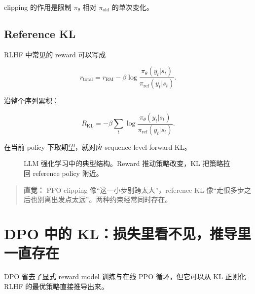 \documentclass[11pt,a4paper]{ctexart}
\newcommand{\piold}{\pi_{\mathrm{old}}}
\newcommand{\piref}{\pi_{\mathrm{ref}}}
\newcommand{\pitheta}{\pi_{\theta}}
\newenvironment{intuition}
{\begin{quote}\small\textbf{直觉：}}
{\end{quote}}
\begin{document}
clipping 的作用是限制 $\pitheta$ 相对 $\piold$ 的单次变化。

\subsection{Reference KL}

RLHF 中常见的 reward 可以写成

\begin{equation}
r_{\mathrm{total}}
=
r_{\mathrm{RM}}
-
\beta
\log
\frac{
\pitheta(y_t|s_t)
}{
\piref(y_t|s_t)
}.
\end{equation}

沿整个序列累积：

\begin{equation}
R_{\mathrm{KL}}
=
-\beta
\sum_t
\log
\frac{
\pitheta(y_t|s_t)
}{
\piref(y_t|s_t)
}.
\end{equation}

在当前 policy 下取期望，就对应 sequence level forward KL。

\begin{figure}[htbp]
\centering
{}
\caption{LLM 强化学习中的典型结构。Reward 推动策略改变，KL 把策略拉回 reference policy 附近。}
\end{figure}

\begin{intuition}
PPO clipping 像“这一小步别跨太大”，reference KL 像“走很多步之后也别离出发点太远”。两种约束经常同时存在。
\end{intuition}

\section{DPO 中的 KL：损失里看不见，推导里一直存在}

DPO 省去了显式 reward model 训练与在线 PPO 循环，但它可以从 KL 正则化 RLHF 的最优策略直接推导出来。
\end{document}
